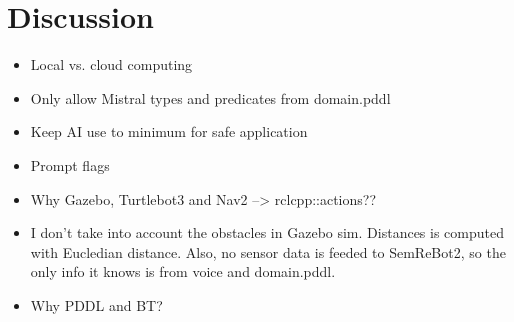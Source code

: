 \chapter{Discussion}\label{ch:discussion}

\begin{itemize}
    \item Local vs. cloud computing
    \item Only allow Mistral types and predicates from domain.pddl
    \item Keep AI use to minimum for safe application
    \item Prompt flags
    \item Why Gazebo, Turtlebot3 and Nav2 --> rclcpp::actions??
    \item I don't take into account the obstacles in Gazebo sim. Distances is computed with Eucledian distance. Also, no sensor data is feeded to SemReBot2, so the only info it knows is from voice and domain.pddl.
    \item Why PDDL and BT?
\end{itemize}